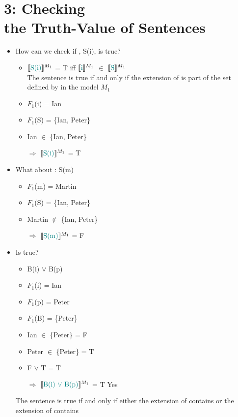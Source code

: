 \documentclass[headrule,footrule]{foils}
\newcommand{\den}[2][]{\ensuremath{\llbracket\textnormal{\textcolor{teal}{#2}}\rrbracket^{\ensuremath{#1}}}}
\begin{document}
\section{3: Checking \\ the Truth-Value of Sentences}

\begin{itemize}
\item How can we check if ,   S(i), is true?
  \begin{itemize}
  \item \den[M_1]{S(i)} = T iff \den[M_1]{i} $\in$ \den[M_1]{S} \\ The
    sentence is true if and only if the extension of  is part of
    the set defined by  in the model $M_1$
  \item $F_1$(i) = Ian
  \item $F_1$(S) =   \{Ian, Peter\}
  \item Ian $\in$  \{Ian, Peter\}
  \item[$\Rightarrow$] \den[M_1]{S(i)} = T
  \end{itemize}
\item What about  : S(m)
  \begin{itemize}
  \item $F_1$(m) = Martin
  \item $F_1$(S) =   \{Ian, Peter\}
  \item Martin $\not\in$  \{Ian, Peter\}
  \item[$\Rightarrow$] \den[M_1]{S(m)} = F
  \end{itemize}
\end{itemize}

 \begin{itemize}
\item Is  true?
  \begin{itemize}
  \item B(i) $\vee$ B(p)
  \item $F_1$(i) = Ian
  \item $F_1$(p) = Peter
  \item $F_1$(B) =   \{Peter\}
  \item Ian $\in$  \{Peter\} = F
  \item Peter $\in$  \{Peter\} = T
  \item F $\vee$ T = T
  \item[$\Rightarrow$] \den[M_1]{B(i) $\vee$ B(p)} = T \hfill Yes
  \end{itemize}
  The sentence  is true if and only if
  either the extension of  contains  or the extension
  of  contains 
\end{itemize}
\end{document}
